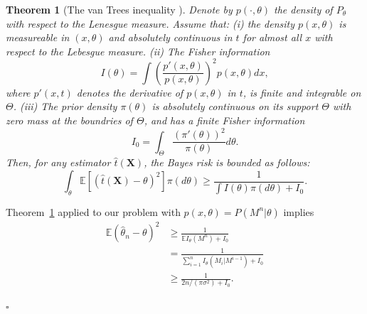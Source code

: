 \documentclass[letterpaper, conference]{IEEEtran}      %
\newtheorem{thm}{\bf{Theorem}}
\newcommand*{\QEDA}{\hfill\ensuremath{\square}}
\begin{document}
\begin{thm}[The van Trees inequality \cite{tsybakov2008introduction}] \label{thm:vanTrees}  Denote by $p(\cdot,\theta)$ the density of $P_\theta$ with respect to the Lenesgue measure. Assume that: (i) the density $p(x,\theta)$ is measureable in $(x,\theta)$ and absolutely continuous in $t$ for almost all $x$ with respect to the Lebesgue measure. (ii) The Fisher information
\[
I(\theta) = \int \left( \frac{p'(x,\theta)}{p(x,\theta)} \right)^2 p(x,\theta) dx,
\]
where $p'(x,t)$ denotes the derivative of $p(x,\theta)$ in $t$, is finite and integrable on $\Theta$. (iii) The prior density $\pi(\theta)$ is absolutely continuous on its support $\Theta$ with zero mass at the boundries of $\Theta$, and has a finite Fisher information
\[
I_0 = \int_{\Theta} \frac{\left( \pi'(\theta) \right)^2} {\pi(\theta)} d\theta.
\]
Then, for any estimator $\widehat{t}(\mathbf X)$, the Bayes risk is bounded as follows:
\[
\int_{\theta} \mathbb E \left[ \left( \widehat{t}(\mathbf X) - \theta\right)^2 \right] \pi(d\theta) \geq \frac{1}{ \int I(\theta) \pi(d \theta) + I_0 }.
\]
\end{thm}
Theorem~\ref{thm:vanTrees} applied to our problem with $p(x,\theta) = P(M^n|\theta)$ implies
\begin{align*}
\mathbb E \left(\widehat{\theta}_n - \theta \right)^2 &  \geq \frac{1}{ \mathbb E I_\theta(M^n) + I_0} \\
& = \frac{1}{ \sum_{i=1}^n I_\theta (M_i | M^{i-1} ) + I_0} \\
& \geq \frac{1}{ 2n/(\pi \sigma^2) + I_0}.
\end{align*}

\QEDA
\end{document}
